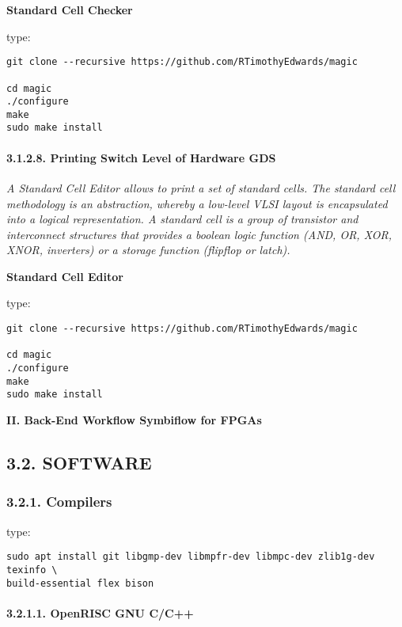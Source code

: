 \documentclass[]{article}
\let\oldparagraph\paragraph
\renewcommand{\paragraph}[1]{\oldparagraph{#1}\mbox{}}
\begin{document}
\textbf{Standard Cell Checker}

type:

\begin{verbatim}
git clone --recursive https://github.com/RTimothyEdwards/magic

cd magic
./configure
make
sudo make install
\end{verbatim}

\paragraph{3.1.2.8. Printing Switch Level of Hardware
GDS}\label{printing-switch-level-of-hardware-gds}

\emph{A Standard Cell Editor allows to print a set of standard cells.
The standard cell methodology is an abstraction, whereby a low-level
VLSI layout is encapsulated into a logical representation. A standard
cell is a group of transistor and interconnect structures that provides
a boolean logic function (AND, OR, XOR, XNOR, inverters) or a storage
function (flipflop or latch).}

\textbf{Standard Cell Editor}

type:

\begin{verbatim}
git clone --recursive https://github.com/RTimothyEdwards/magic

cd magic
./configure
make
sudo make install
\end{verbatim}

\textbf{II. Back-End Workflow Symbiflow for FPGAs}

\subsection{3.2. SOFTWARE}\label{software}

\subsubsection{3.2.1. Compilers}\label{compilers}

type:

\begin{verbatim}
sudo apt install git libgmp-dev libmpfr-dev libmpc-dev zlib1g-dev texinfo \
build-essential flex bison
\end{verbatim}

\paragraph{3.2.1.1. OpenRISC GNU C/C++}\label{openrisc-gnu-cc}
\end{document}
